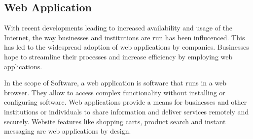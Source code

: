 \subsection{Web Application}
With recent developments leading to increased availability and usage of the Internet, the way businesses and institutions are run has been influcenced.
This has led to the widespread adoption of web applications by companies. 
Businesses hope to streamline their processes and increase efficiency by employing web applications. 
\cite{stackpath/webapp}

In the scope of Software, a web application is software that runs in a web browser.
They allow to access complex functionality without installing or configuring software.
Web applications provide a means for businesses and other institutions or individuals to share information and deliver services remotely and securely.
Website features like shopping carts, product search and instant messaging are web applications by design. \cite{aws/webapp}

